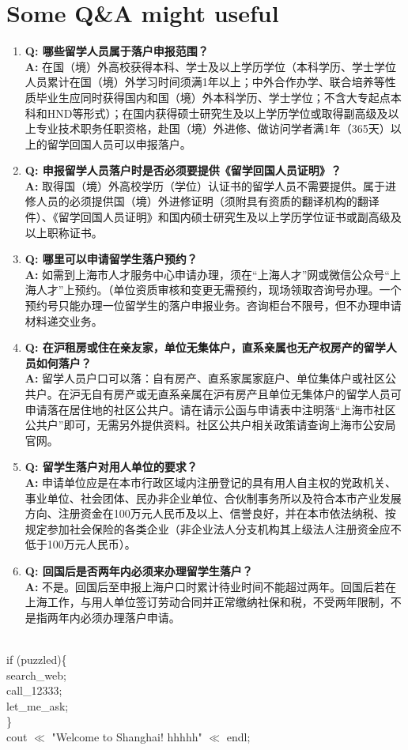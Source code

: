 \documentclass[a4paper,12pt]{book}
\begin{document}
\section*{Some Q\&A might useful}
\begin{enumerate}[1.]
\item \textbf{Q: 哪些留学人员属于落户申报范围？}\\
\textbf{A: }在国（境）外高校获得本科、学士及以上学历学位（本科学历、学士学位人员累计在国（境）外学习时间须满1年以上；中外合作办学、联合培养等性质毕业生应同时获得国内和国（境）外本科学历、学士学位；不含大专起点本科和HND等形式）；在国内获得硕士研究生及以上学历学位或取得副高级及以上专业技术职务任职资格，赴国（境）外进修、做访问学者满1年（365天）以上的留学回国人员可以申报落户。

\item \textbf{Q: 申报留学人员落户时是否必须要提供《留学回国人员证明》？}\\
\textbf{A: }取得国（境）外高校学历（学位）认证书的留学人员不需要提供。属于进修人员的必须提供国（境）外进修证明（须附具有资质的翻译机构的翻译件）、《留学回国人员证明》和国内硕士研究生及以上学历学位证书或副高级及以上职称证书。

\item \textbf{Q: 哪里可以申请留学生落户预约？}\\
\textbf{A: }如需到上海市人才服务中心申请办理，须在“上海人才”网或微信公众号“上海人才”上预约。（单位资质审核和变更无需预约，现场领取咨询号办理。一个预约号只能办理一位留学生的落户申报业务。咨询柜台不限号，但不办理申请材料递交业务。

\item \textbf{Q: 在沪租房或住在亲友家，单位无集体户，直系亲属也无产权房产的留学人员如何落户？ }\\
\textbf{A: }留学人员户口可以落：自有房产、直系家属家庭户、单位集体户或社区公共户。在沪无自有房产或无直系亲属在沪有房产且单位无集体户的留学人员可申请落在居住地的社区公共户。请在请示公函与申请表中注明落“上海市社区公共户”即可，无需另外提供资料。社区公共户相关政策请查询上海市公安局官网。

\item \textbf{Q: 留学生落户对用人单位的要求？ }\\
\textbf{A: }申请单位应是在本市行政区域内注册登记的具有用人自主权的党政机关、事业单位、社会团体、民办非企业单位、合伙制事务所以及符合本市产业发展方向、注册资金在100万元人民币及以上、信誉良好，并在本市依法纳税、按规定参加社会保险的各类企业（非企业法人分支机构其上级法人注册资金应不低于100万元人民币）。

\item \textbf{Q: 回国后是否两年内必须来办理留学生落户？ }\\
\textbf{A: }不是。回国后至申报上海户口时累计待业时间不能超过两年。回国后若在上海工作，与用人单位签订劳动合同并正常缴纳社保和税，不受两年限制，不是指两年内必须办理落户申请。
\end{enumerate}

\noindent
\myline
\\
if (puzzled)\{\\
 \indent	search\_web;\\
 \indent	call\_12333;\\
 \indent	let\_me\_ask;\\
\}\\
cout $\ll$ "Welcome to Shanghai! hhhhh" $\ll$ endl;
\end{document}
